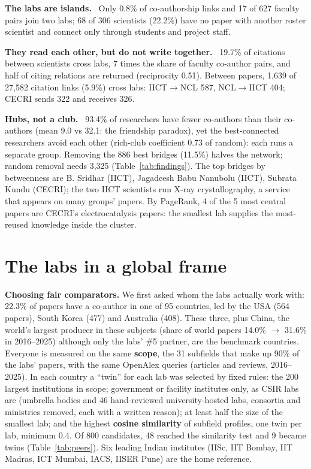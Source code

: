 \documentclass[10pt,a4paper,twocolumn]{article}
\newcommand{\obs}[1]{\textbf{\color{navy}#1}\ }
\begin{document}
\obs{The labs are islands.} Only 0.8\% of co-authorship links and 17 of 627 faculty pairs join two labs; 68 of 306 scientists (22.2\%) have no paper with another roster scientist and connect only through students and project staff.

\obs{They read each other, but do not write together.} 19.7\% of citations between scientists cross labs, 7 times the share of faculty co-author pairs, and half of citing relations are returned (reciprocity 0.51). Between papers, 1,639 of 27,582 citation links (5.9\%) cross labs: IICT$\to$NCL 587, NCL$\to$IICT 404; CECRI sends 322 and receives 326.

\obs{Hubs, not a club.} 93.4\% of researchers have fewer co-authors than their co-authors (mean 9.0 vs 32.1: the friendship paradox), yet the best-connected researchers avoid each other (rich-club coefficient 0.73 of random): each runs a separate group. Removing the 886 best bridges (11.5\%) halves the network; random removal needs 3,325 (Table~\ref{tab:findings}). The top bridges by betweenness are B. Sridhar (IICT), Jagadeesh Babu Nanubolu (IICT), Subrata Kundu (CECRI); the two IICT scientists run X-ray crystallography, a service that appears on many groups' papers. By PageRank, 4 of the 5 most central papers are CECRI's electrocatalysis papers: the smallest lab supplies the most-reused knowledge inside the cluster.

\section{The labs in a global frame}
\textbf{Choosing fair comparators.} We first asked whom the labs actually work with: 22.3\% of papers have a co-author in one of 95 countries, led by the USA (564 papers), South Korea (477) and Australia (408). These three, plus China, the world's largest producer in these subjects (share of world papers 14.0\% $\to$ 31.6\% in 2016--2025) although only the labs' \#5 partner, are the benchmark countries. Everyone is measured on the same \textbf{scope}, the 31 subfields that make up 90\% of the labs' papers, with the same OpenAlex queries (articles and reviews, 2016--2025). In each country a ``twin'' for each lab was selected by fixed rules: the 200 largest institutions in scope; government or facility institutes only, as CSIR labs are (umbrella bodies and 46 hand-reviewed university-hosted labs, consortia and ministries removed, each with a written reason); at least half the size of the smallest lab; and the highest \textbf{cosine similarity} of subfield profiles, one twin per lab, minimum 0.4. Of 800 candidates, 48 reached the similarity test and 9 became twins (Table~\ref{tab:peers}). Six leading Indian institutes (IISc, IIT Bombay, IIT Madras, ICT Mumbai, IACS, IISER Pune) are the home reference.
\end{document}
